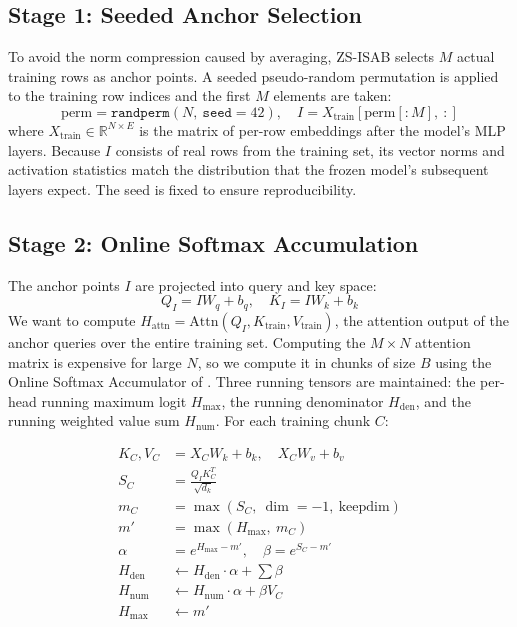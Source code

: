 \documentclass[10pt]{article}
\begin{document}
\subsection{Stage 1: Seeded Anchor Selection}

To avoid the norm compression caused by averaging, ZS-ISAB selects $M$ actual training rows as anchor points. A seeded pseudo-random permutation is applied to the training row indices and the first $M$ elements are taken:
\begin{equation}
    \text{perm} = \texttt{randperm}(N,\ \texttt{seed}=42), \quad I = X_{\text{train}}[\text{perm}[:M],\ :]
\end{equation}
where $X_{\text{train}} \in \mathbb{R}^{N \times E}$ is the matrix of per-row embeddings after the model's MLP layers. Because $I$ consists of real rows from the training set, its vector norms and activation statistics match the distribution that the frozen model's subsequent layers expect. The seed is fixed to ensure reproducibility.

\subsection{Stage 2: Online Softmax Accumulation}

The anchor points $I$ are projected into query and key space:
\begin{equation}
    Q_I = IW_q + b_q, \quad K_I = IW_k + b_k
\end{equation}
We want to compute $H_{\text{attn}} = \text{Attn}(Q_I, K_{\text{train}}, V_{\text{train}})$, the attention output of the anchor queries over the entire training set. Computing the $M \times N$ attention matrix is expensive for large $N$, so we compute it in chunks of size $B$ using the Online Softmax Accumulator of \citet{milakov2018online}. Three running tensors are maintained: the per-head running maximum logit $H_{\text{max}}$, the running denominator $H_{\text{den}}$, and the running weighted value sum $H_{\text{num}}$. For each training chunk $C$:

\begin{align}
    K_C, V_C &= X_C W_k + b_k,\quad X_C W_v + b_v \\
    S_C &= \frac{Q_I K_C^T}{\sqrt{d_k}} \\
    m_C &= \max(S_C,\ \dim=-1,\ \text{keepdim}) \\
    m' &= \max(H_{\text{max}},\ m_C) \\
    \alpha &= e^{H_{\text{max}} - m'},\quad \beta = e^{S_C - m'} \\
    H_{\text{den}} &\leftarrow H_{\text{den}} \cdot \alpha + \textstyle\sum\beta \\
    H_{\text{num}} &\leftarrow H_{\text{num}} \cdot \alpha + \beta V_C \\
    H_{\text{max}} &\leftarrow m'
\end{align}
\end{document}
